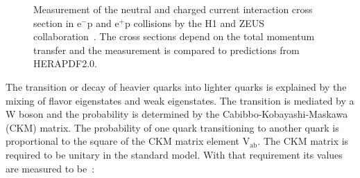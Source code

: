 \begin{figure}[htbp!]
  \begin{center}

\caption{Measurement of the neutral and charged current interaction cross section in $\mathrm{e}^-$p and $\mathrm{e}^+$p collisions by the H1 and ZEUS collaboration~\cite{Abramowicz:2015mha}.
The cross sections depend on the total momentum transfer and the measurement is compared to predictions from HERAPDF2.0.
  \label{fig:theo_ew}}
  \end{center}
\end{figure}

The transition or decay of heavier quarks into lighter quarks is explained by the mixing of flavor eigenstates and weak eigenstates. The transition is mediated by a W boson and the 
probability is determined by the Cabibbo-Kobayashi-Maskawa (CKM) matrix. The probability of one quark transitioning to another quark is proportional to the square of the CKM matrix element $\mathrm{V}_{\mathrm{ab}}$.
The CKM matrix is required to be unitary in the standard model. With that requirement its values are measured to be~\cite{Olive:2016xmw}:
 
